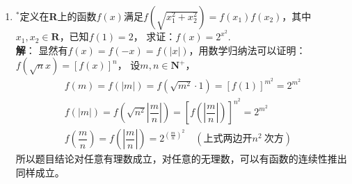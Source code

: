 \begin{enumerate}[label={\textbf{\arabic*.}},leftmargin=
    \inteval{\myenumleftmargin}pt]
\item $ ^* $定义在\textbf{R}上的函数$ f(x) $满足$ f(\sqrt{x_1^2+x_2^2})= 
f(x_1)f(x_2) $，其中$ x_1,x_2\in \textbf{R} $，已知$ f(1)=2 $，
求证：$ f(x)=2^{x^2} $.
\ifteach \\ \textbf{解}：
显然有$ f(x)=f(-x)=f(|x|) $，用数学归纳法可以证明：$ f(\sqrt{n}x)=[f(x)]^n $，
设$ m,n \in \textbf{N}^+ $，
\begin{gather*}
    f(m)=f(|m|)=f(\sqrt{m^2}\cdot 1)=[f(1)]^{m^2}=2^{m^2} \\
    f(|m|)=f\left(\sqrt{n^2}\left|\dfrac{m}{n}\right|\right)
    =\left[f\left(\left|\dfrac{m}{n}\right|\right)\right]^{n^2}=2^{m^2} \\
    f\left(\dfrac{m}{n}\right)=f\left(\left|\dfrac{m}{n}\right|\right)
    =2^{(\frac{m}{n})^2} \quad (\text{上式两边开} n^2\ \text{次方} )
\end{gather*}
所以题目结论对任意有理数成立，对任意的无理数，可以有函数的连续性推出同样成立。
\fi


\end{enumerate}
\myfootnote{\CopyrightStatementChap}

\cleardoublepage

